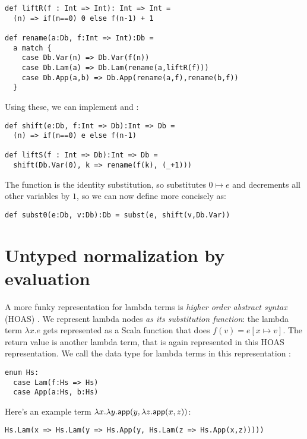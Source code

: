 \begin{lstlisting}
def liftR(f : Int => Int): Int => Int =
  (n) => if(n==0) 0 else f(n-1) + 1

def rename(a:Db, f:Int => Int):Db =
  a match {
    case Db.Var(n) => Db.Var(f(n))
    case Db.Lam(a) => Db.Lam(rename(a,liftR(f)))
    case Db.App(a,b) => Db.App(rename(a,f),rename(b,f))
  }
\end{lstlisting}

Using these, we can implement  and :

\begin{lstlisting}
def shift(e:Db, f:Int => Db):Int => Db =
  (n) => if(n==0) e else f(n-1)

def liftS(f : Int => Db):Int => Db =
  shift(Db.Var(0), k => rename(f(k), (_+1)))
\end{lstlisting}

The function  is the identity substitution, so  substitutes $0 \mapsto e$ and decrements all other variables by $1$, so we can now define  more concisely as:

\begin{lstlisting}
def subst0(e:Db, v:Db):Db = subst(e, shift(v,Db.Var))
\end{lstlisting}

\section{Untyped normalization by evaluation}

A more funky representation for lambda terms is \emph{higher order abstract syntax} (HOAS) \cite{pfenning88}.
We represent lambda nodes \emph{as its substitution function}: the lambda term $\lambda x. e$ gets represented as a Scala function that does $f(v) = e[x \mapsto v]$.
The return value is another lambda term, that is again represented in this HOAS representation.
We call the data type for lambda terms in this representation :

\begin{lstlisting}
enum Hs:
  case Lam(f:Hs => Hs)
  case App(a:Hs, b:Hs)
\end{lstlisting}

Here's an example term $\lambda x. \lambda y. \mathsf{app}(y, \lambda z. \mathsf{app}(x,z))$:

\begin{lstlisting}
Hs.Lam(x => Hs.Lam(y => Hs.App(y, Hs.Lam(z => Hs.App(x,z)))))
\end{lstlisting}

